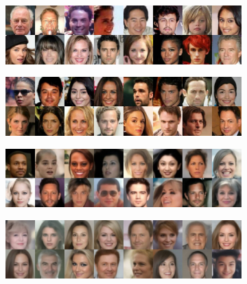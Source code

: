 \documentclass{article}
\begin{document}
\begin{figure}
  \begin{subfigure}{0.245\textwidth}
    \includegraphics[width=\linewidth]{figs/imgs/data_samples_diversity_0_tc.jpg}
  \end{subfigure}
  \begin{subfigure}{0.245\textwidth}
    \includegraphics[width=\linewidth]{figs/imgs/standard_sampler_samples_diversity_1000_tc.jpg}
  \end{subfigure}
  \begin{subfigure}{0.245\textwidth}
    \includegraphics[width=\linewidth]{figs/imgs/gslddim_samples_diversity_500_tc.jpg}
  \end{subfigure}
  \begin{subfigure}{0.245\textwidth}
    \includegraphics[width=\linewidth]{figs/imgs/ddim_samples_diversity_800_tc.jpg}
  \end{subfigure}  \vfill
  \begin{subfigure}{0.285\textwidth}

\end{subfigure}
\end{figure}
\end{document}
